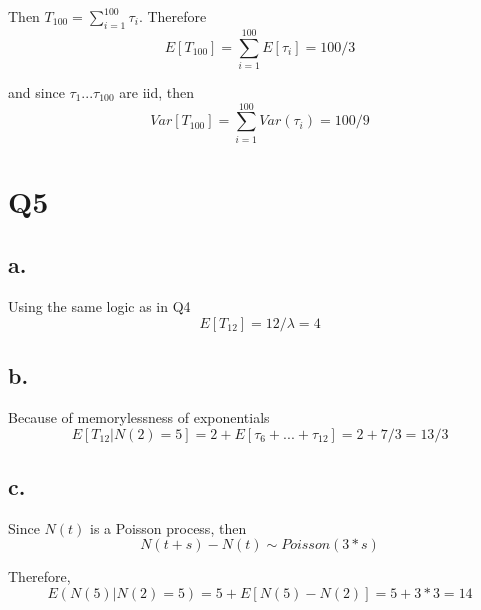 \documentclass{article}
\begin{document}
Then $T_100 = \sum_{i = 1} ^{100} \tau_i$.
Therefore
\[
E[T_100] = \sum_{i = 1} ^{100} E[\tau_i] = 100/3
\]

and since $\tau_1 ... \tau_100$ are iid, then
\[
Var[T_100] = \sum_{i=1}^{100} Var(\tau_i) = 100/9
\]

\section*{Q5}
\subsection*{a.}
Using the same logic as in Q4
\[
E[T_{12}] = 12/\lambda = 4
\]

\subsection*{b.}
Because of memorylessness of exponentials
\[
E[T_{12} | N(2) = 5] = 2 + E[ \tau_6 +... +\tau_12] = 2 + 7/3 = 13/3
\]

\subsection*{c.}
Since $N(t)$ is a Poisson process, then
\[
N(t + s) - N(t) \sim Poisson(3 * s)
\]

Therefore, 
\[
E(N(5) | N(2) = 5) = 5 + E[N(5) - N(2)] = 5 + 3 * 3 = 14
\]
\end{document}
